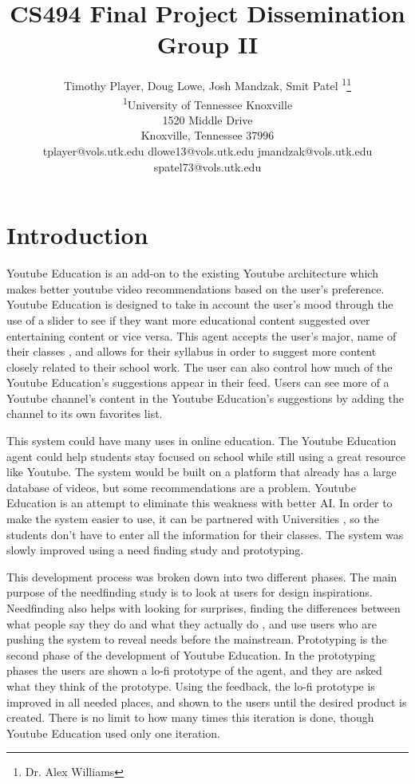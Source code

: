 \documentclass[letterpaper]{article} %
\title{CS494 Final Project Dissemination Group II}
\author{Timothy Player, Doug Lowe, Josh Mandzak, Smit Patel \textsuperscript{\rm 1}\thanks{Dr. Alex Williams}\\ %
\textsuperscript{\rm 1}University of Tennessee Knoxville\\ %
1520 Middle Drive\\
Knoxville, Tennessee  37996\\
tplayer@vols.utk.edu dlowe13@vols.utk.edu jmandzak@vols.utk.edu spatel73@vols.utk.edu%
}
\begin{document}
\maketitle
\section{Introduction}
Youtube Education is an add-on to the existing Youtube architecture which makes better youtube video recommendations based on the user’s preference. Youtube Education is designed to take in account the user’s mood through the use of a slider to see if they want more educational content suggested over entertaining content or vice versa. This agent accepts the user’s major, name of their classes , and allows for their syllabus in order to suggest more content closely related to their school work. The user can also control how much of the Youtube Education’s suggestions appear in their feed. Users can see more of a Youtube channel’s content in the Youtube Education’s suggestions by adding the channel to its own favorites list. 


	This system could have many uses in online education. The Youtube Education agent could help students stay focused on school while still using a great resource like Youtube. The system would be built on a platform that already has a large database of videos, but some recommendations are a problem. Youtube Education is an attempt to eliminate this weakness with better AI. In order to make the system easier to use, it can be partnered with Universities , so the students don’t have to enter all the information for their classes. The system was slowly improved using a need finding study and prototyping. 


	This development process was broken down into two different phases. The main purpose of the needfinding study is to look at users for design inspirations. Needfinding also helps with looking for surprises, finding the differences between what people say they do and what they actually do , and use users who are pushing the system to reveal needs before the mainstream. Prototyping is the second phase of the development of Youtube Education. In the prototyping phases the users are shown a lo-fi prototype of the agent, and they are asked what they think of the prototype. Using the feedback, the lo-fi prototype is improved in all needed places, and shown to the users until the desired product is created.  There is no limit to how many times this iteration is done, though Youtube Education used only one iteration.
\end{document}
